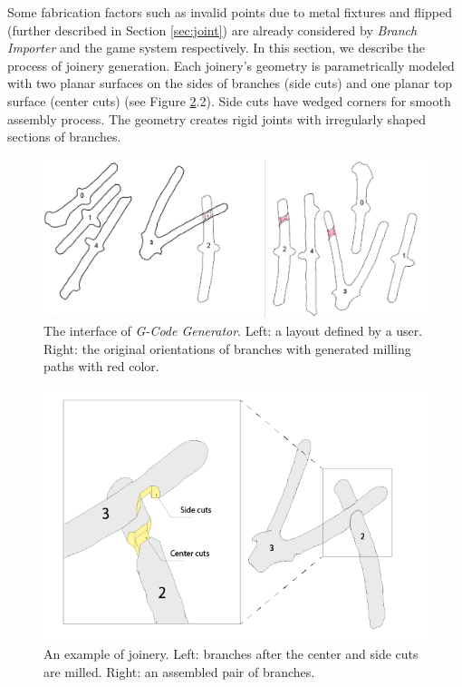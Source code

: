 Some fabrication factors such as invalid points due to metal fixtures and flipped (further described in Section \ref{sec:joint}) are already considered by \textit{Branch Importer} and the game system respectively.
In this section, we describe the process of joinery generation.
Each joinery's geometry is parametrically modeled with two planar surfaces on the sides of branches (side cuts) and one planar top surface (center cuts) (see Figure \ref{fig:joint_geometry}.2).
Side cuts have wedged corners for smooth assembly process.
The geometry creates rigid joints with irregularly shaped sections of branches.\\

\begin{figure}[ht]
  \begin{center}
    \includegraphics[width = 0.35\paperwidth]{images/system/gcode_generator_interface.png}
    \caption{The interface of \textit{G-Code Generator}. Left: a layout defined by a user. Right: the original orientations of branches with generated milling paths with red color. }
    \label{fig:gcode_gen}
  \end{center}
\end{figure}

\begin{figure}[h]
	\begin{center}
		\includegraphics[width = 0.4\paperwidth]{images/system/joint_closeup.png}
		\caption{An example of joinery. Left: branches after the center and side cuts are milled. Right: an assembled pair of branches. }
		\label{fig:joint_geometry}
	\end{center}
\end{figure}

